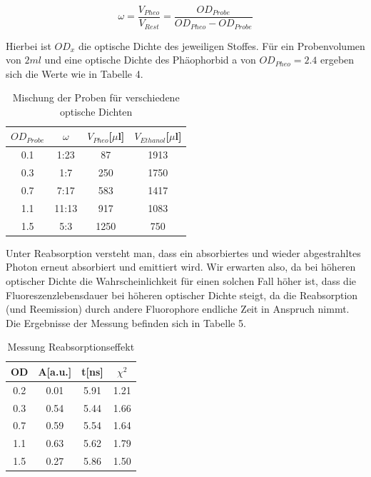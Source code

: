 \documentclass{article}
\begin{document}
\begin{equation}
  \omega = \frac{V_{Pheo}}{V_{Rest}}=\frac{OD_{Probe}}{OD_{Pheo}-OD_{Probe}}
\end{equation}



Hierbei ist $OD_x$ die optische Dichte des jeweiligen Stoffes. Für ein Probenvolumen von $2ml$ und eine
optische Dichte des Phäophorbid a von $OD_{Pheo}=2.4$ ergeben sich die Werte wie in Tabelle 4.

\begin{table}[h]
  \centering
  \begin{tabular}{c|c|c|c}
    $OD_{Probe}$ & $\omega$ & $V_{Pheo}$[$\mu$l] & $V_{Ethanol}$[$\mu$l] \\
    \hline
    0.1          &  1:23  & 87                & 1913 \\
    0.3          &  1:7   & 250               & 1750 \\
    0.7          &  7:17  & 583               & 1417 \\
    1.1          &  11:13 & 917               & 1083 \\
    1.5          &  5:3   & 1250              & 750  \\
  \end{tabular}
  \caption{Mischung der Proben für verschiedene optische Dichten}
\end{table}



Unter Reabsorption versteht man, dass ein absorbiertes und wieder abgestrahltes Photon erneut absorbiert und emittiert wird.
Wir erwarten also, da bei höheren optischer Dichte die Wahrscheinlichkeit für einen solchen Fall höher ist, dass die Fluoreszenzlebensdauer
bei höheren optischer Dichte steigt, da die Reabsorption (und Reemission) durch andere Fluorophore endliche Zeit in Anspruch nimmt. Die Ergebnisse der Messung befinden sich in Tabelle 5.


\begin{table}[h]
  \centering
  \begin{tabular}{c|c|c|c}
    OD           & A[a.u.]& t[ns]             & $\chi^2$\\
    \hline
    0.2          &  0.01  & 5.91              & 1.21  \\
    0.3          &  0.54  & 5.44              & 1.66  \\
    0.7          &  0.59  & 5.54              & 1.64  \\
    1.1          &  0.63  & 5.62              & 1.79  \\
    1.5          &  0.27  & 5.86              & 1.50   \\
  \end{tabular}
  \caption{Messung Reabsorptionseffekt}
\end{table}
\end{document}
